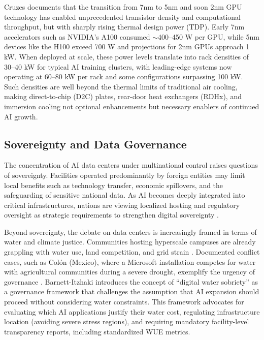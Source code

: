 \documentclass[conference]{IEEEtran}
\begin{document}
Cruzes \cite{Cruzes2026} documents that the transition from 7nm to 5nm and soon 2nm GPU technology has enabled unprecedented transistor density and computational throughput, but with sharply rising thermal design power (TDP). Early 7nm accelerators such as NVIDIA's A100 consumed $\sim$400--450 W per GPU, while 5nm devices like the H100 exceed 700 W and projections for 2nm GPUs approach 1 kW. When deployed at scale, these power levels translate into rack densities of 30--40 kW for typical AI training clusters, with leading-edge systems now operating at 60--80 kW per rack and some configurations surpassing 100 kW. Such densities are well beyond the thermal limits of traditional air cooling, making direct-to-chip (D2C) plates, rear-door heat exchangers (RDHx), and immersion cooling not optional enhancements but necessary enablers of continued AI growth.

\subsection{Sovereignty and Data Governance}

The concentration of AI data centers under multinational control raises questions of sovereignty. Facilities operated predominantly by foreign entities may limit local benefits such as technology transfer, economic spillovers, and the safeguarding of sensitive national data. As AI becomes deeply integrated into critical infrastructures, nations are viewing localized hosting and regulatory oversight as strategic requirements to strengthen digital sovereignty \cite{Cruzes2026}.

Beyond sovereignty, the debate on data centers is increasingly framed in terms of water and climate justice. Communities hosting hyperscale campuses are already grappling with water use, land competition, and grid strain \cite{Guidi2024b}. Documented conflict cases, such as Colón (Mexico), where a Microsoft installation competes for water with agricultural communities during a severe drought, exemplify the urgency of governance \cite{Barnett2026}. Barnett-Itzhaki \cite{Barnett2026} introduces the concept of ``digital water sobriety'' as a governance framework that challenges the assumption that AI expansion should proceed without considering water constraints. This framework advocates for evaluating which AI applications justify their water cost, regulating infrastructure location (avoiding severe stress regions), and requiring mandatory facility-level transparency reports, including standardized WUE metrics.
\end{document}
